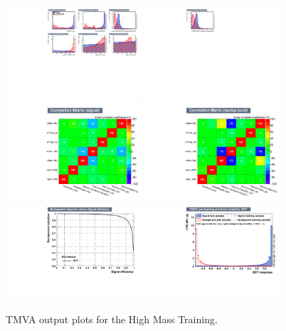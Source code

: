 \begin{figure}[thb]
  \centering
  \includegraphics[width=0.45\textwidth]{figures/sec-cats/mva/vars1_hm400}\hfil
  \includegraphics[width=0.45\textwidth]{figures/sec-cats/mva/vars2_hm400}\hfil
  \includegraphics[width=0.45\textwidth]{figures/sec-cats/mva/corsS_hm400}\hfil
  \includegraphics[width=0.45\textwidth]{figures/sec-cats/mva/corsB_hm400}\hfil
  \includegraphics[width=0.45\textwidth]{figures/sec-cats/mva/ROC_hm400}\hfil
  \includegraphics[width=0.45\textwidth]{figures/sec-cats/mva/discr_hm400}\hfil
  \caption{TMVA output plots for the High Mass Training.}
  \label{fig:mva_hm}
\end{figure}

